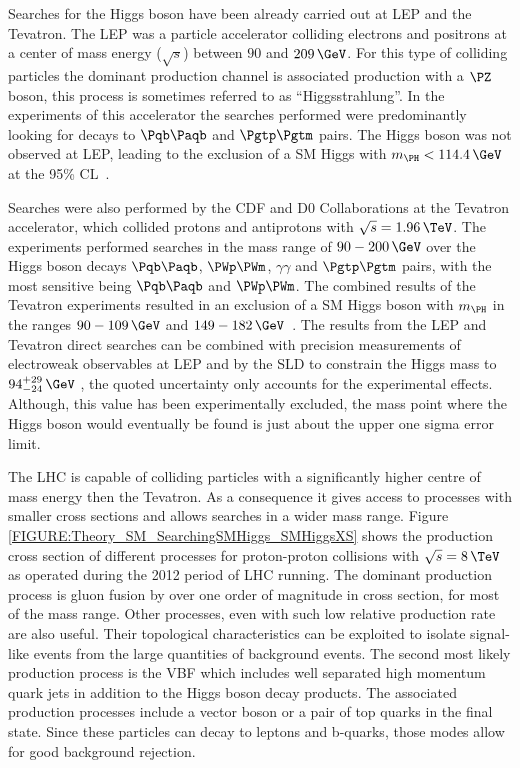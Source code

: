 Searches for the Higgs boson have been already carried out at \gls{LEP} and the Tevatron. The \gls{LEP} was a particle accelerator colliding electrons and positrons at a center of mass energy ($\sqrt{s}$) between $90$ and $209\,\GeV$. For this type of colliding particles the dominant production channel is associated production with a $\PZ$ boson, this process is sometimes referred to as ``Higgsstrahlung''. In the experiments of this accelerator the searches performed were predominantly looking for decays to $\Pqb\Paqb$ and $\Pgtp\Pgtm$ pairs. The Higgs boson was not observed at \gls{LEP}, leading to the exclusion of a \gls{SM} Higgs with $m_{\PH}<114.4\,\GeV$ at the 95\% \gls{CL}~\cite{ARTICLE:LEPWorkingGroupforHiggsBosonSearches}.

Searches were also performed by the CDF and D0 Collaborations at the Tevatron accelerator, which collided protons and antiprotons with $\sqrt{s}=1.96\,\TeV$. The experiments performed searches in the mass range of $90-200\,\GeV$ over the Higgs boson decays $\Pqb\Paqb$, $\PWp\PWm$, $\gamma\gamma$ and $\Pgtp\Pgtm$ pairs, with the most sensitive being $\Pqb\Paqb$ and $\PWp\PWm$. The combined results of the Tevatron experiments resulted in an exclusion of a \gls{SM} Higgs boson with $m_{\PH}$ in the ranges $90-109\,\GeV$ and $149-182\,\GeV$~\cite{ARTICLE:CDFDOHiggsBosonStudies}. The results from the \gls{LEP} and Tevatron direct searches can be combined with precision measurements of electroweak observables at \gls{LEP} and by the \gls{SLD} to constrain the Higgs mass to $94^{+29}_{-24}\,\GeV$ \cite{SITE:lepewwg}, the quoted uncertainty only accounts for the experimental effects. Although, this value has been experimentally excluded, the mass point where the Higgs boson would eventually be found is just about the upper one sigma error limit.

The \gls{LHC} is capable of colliding particles with a significantly higher centre of mass energy then the Tevatron. As a consequence it gives access to processes with smaller cross sections and allows searches in a wider mass range. Figure \ref{FIGURE:Theory_SM_SearchingSMHiggs_SMHiggsXS} shows the production cross section of different processes for proton-proton collisions with $\sqrt{s}=8\,\TeV$ as operated during the 2012 period of \gls{LHC} running. The dominant production process is  gluon fusion by over one order of magnitude in cross section, for most of the mass range. Other processes, even with such low relative production rate are also useful. Their topological characteristics can be exploited to isolate signal-like events from the large quantities of background events. The second most likely production process is the \gls{VBF} which includes well separated high momentum quark jets in addition to the Higgs boson decay products. The associated production processes include a vector boson or a pair of top quarks in the final state. Since these particles can decay to leptons and b-quarks, those modes allow for good background rejection.

